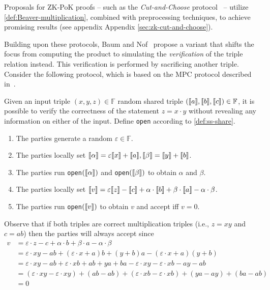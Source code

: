 \documentclass[11pt]{report}
\theoremstyle{definition}
\theoremstyle{plain}
\begin{document}
Proposals for ZK-PoK proofs -- such as the \textit{Cut-and-Choose} protocol~\cite{katz2018improved,baum2020concretely} -- utilize \autoref{def:Beaver-multiplication}, combined with preprocessing techniques, to achieve promising results (see appendix Appendix \ref{sec:zk-cut-and-choose}).

Building upon these protocols, Baum and Nof~\cite{baum2020concretely} propose a variant that shifts the focus from computing the product to simulating the \textit{verification} of the triple relation instead. This verification is performed by sacrificing another triple. Consider the following protocol, which is based on the MPC protocol described in~\cite{damgaard2012multiparty}.

\newpage
\begin{protocol}\label{def:sacrifice}
  Given an input triple $(x,y,z) \in \mathbb{F}$ random shared triple $(\llbracket a \rrbracket, \llbracket b \rrbracket, \llbracket c \rrbracket) \in \mathbb{F}$, it is possible to verify the correctness of the statement $z = x \cdot y$ without revealing any information on either of the input. Define \texttt{open} according to \autoref{def:ss-share}.
  \begin{enumerate}[parsep=0pt, itemsep=0pt, topsep=0pt]
    \item The parties generate a random $\varepsilon \in \mathbb{F}$.
    \item The parties locally set $\llbracket \alpha \rrbracket = \varepsilon\llbracket x \rrbracket + \llbracket a \rrbracket, \llbracket \beta \rrbracket = \llbracket y \rrbracket + \llbracket b \rrbracket$.
    \item The parties run \texttt{open}$(\llbracket \alpha \rrbracket)$ and \texttt{open}$(\llbracket \beta \rrbracket)$ to obtain $\alpha$ and $\beta$.
    \item The parties locally set $\llbracket v \rrbracket = \varepsilon\llbracket z \rrbracket - \llbracket c \rrbracket + \alpha  \cdot \llbracket b \rrbracket + \beta  \cdot \llbracket a \rrbracket - \alpha  \cdot \beta$.
    \item The parties run \texttt{open}$(\llbracket v \rrbracket)$ to obtain $v$ and accept iff $v = 0$.
  \end{enumerate}
\end{protocol}

Observe that if both triples are correct multiplication triples (i.e., $z = xy$ and $c = ab$) then the parties will always accept since
\begin{align*}
  v & = \varepsilon \cdot z - c + \alpha \cdot b + \beta \cdot a - \alpha \cdot \beta                                                     \\
    & = \varepsilon \cdot xy - ab + (\varepsilon \cdot x + a)b + (y + b)a - (\varepsilon \cdot x + a)(y + b)                              \\
    & = \varepsilon \cdot xy - ab + \varepsilon \cdot xb + ab + ya + ba - \varepsilon \cdot xy - \varepsilon \cdot xb - ay - ab           \\
    & = (\varepsilon \cdot xy - \varepsilon \cdot xy) + (ab - ab) + (\varepsilon \cdot xb - \varepsilon \cdot xb) + (ya - ay) + (ba - ab) \\
    & = 0
\end{align*}
\end{document}
